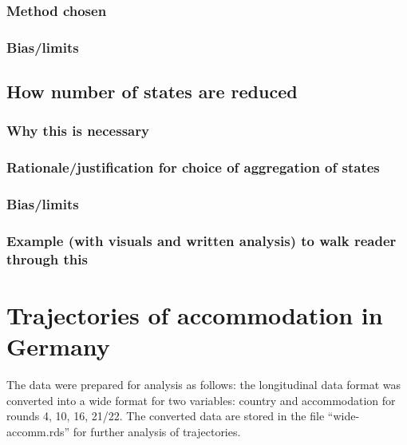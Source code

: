 \documentclass[
  letterpaper,
  DIV=11,
  numbers=noendperiod]{scrreprt}
\begin{document}
\subsection{Method chosen}\label{method-chosen}

\subsection{Bias/limits}\label{biaslimits}

\section{How number of states are
reduced}\label{how-number-of-states-are-reduced}

\subsection{Why this is necessary}\label{why-this-is-necessary-1}

\subsection{Rationale/justification for choice of aggregation of
states}\label{rationalejustification-for-choice-of-aggregation-of-states}

\subsection{Bias/limits}\label{biaslimits-1}

\subsection{Example (with visuals and written analysis) to walk reader
through
this}\label{example-with-visuals-and-written-analysis-to-walk-reader-through-this}


\chapter{Trajectories of accommodation in
Germany}\label{trajectories-of-accommodation-in-germany}

The data were prepared for analysis as follows: the longitudinal data
format was converted into a wide format for two variables: country and
accommodation for rounds 4, 10, 16, 21/22. The converted data are stored
in the file ``wide-accomm.rds'' for further analysis of trajectories.
\end{document}
